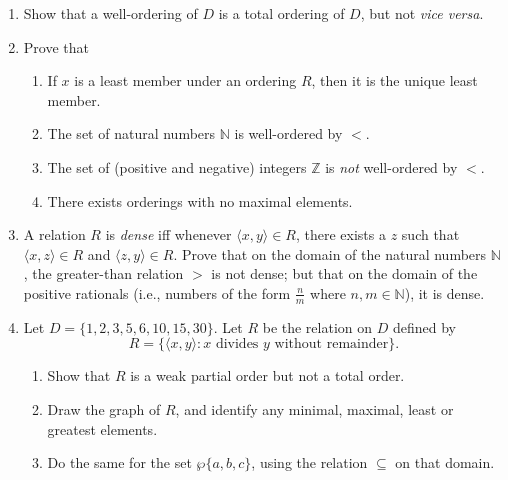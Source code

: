 {\begin{enumerate}
\item Show that a well-ordering of $D$ is a total ordering
    of $D$, but not \emph{vice versa}.

  
  



\item Prove that \begin{enumerate}
  \item If $x$ is a least member under an ordering $R$, then it is the unique least member.
  \item The set of natural numbers $\mathbb{N}$ is well-ordered by $<$.
  \item The set of (positive and negative) integers $\mathbb{Z}$ is \emph{not} well-ordered by $<$.
  \item There exists orderings with no maximal elements.
\end{enumerate}

\item A relation $R$ is \emph{dense} iff whenever $\langle x,y\rangle \in R$, there exists a $z$ such that $\langle x,z\rangle \in R$ and $\langle z,y\rangle \in R$. Prove that on the domain of the natural numbers $\mathbb{N}$, the greater-than relation $>$ is not dense; but that on the domain of the positive rationals (i.e., numbers of the form $\frac{n}{m}$ where $n,m \in \mathbb{N}$), it is dense.

\item Let $D = \{1,2,3,5,6,10,15,30\}$. Let $R$ be the relation on $D$ defined by \begin{equation*}
  R = \{\langle x,y\rangle: x\text{ divides $y$ without remainder}\}.
\end{equation*}\begin{enumerate}
  \item Show that $R$ is a weak partial order but not a total order.
  \item Draw the graph of $R$, and identify any minimal, maximal, least or greatest elements.
  \item Do the same for the set $\wp \{a,b,c\}$, using the relation $\subseteq$ on that domain.
\end{enumerate}


\end{enumerate}}
